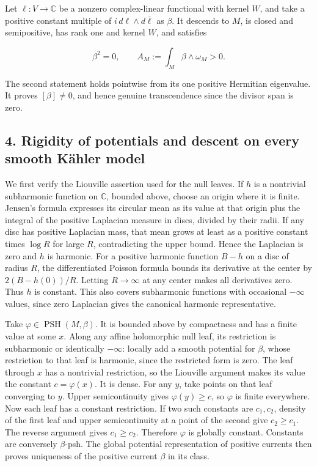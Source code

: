 \documentclass[11pt]{article}
\begin{document}
Let $\ell:V\to\mathbb C$ be a nonzero complex-\allowbreak{}linear functional with kernel $W$, and take a positive constant multiple of $i\,d\ell\wedge d\overline\ell$ as $\beta$. It descends to $M$, is closed and semipositive, has rank one and kernel $W$, and satisfies

\[\beta^2=0,\qquad A_M:=\int_M\beta\wedge\omega_M>0.\]

The second statement holds pointwise from its one positive Hermitian eigenvalue. It proves $[\beta]\ne0$, and hence genuine transcendence since the divisor span is zero.

\subsection{4. Rigidity of potentials and descent on every smooth Kähler model}

We first verify the Liouville assertion used for the null leaves. If $h$ is a nontrivial subharmonic function on $\mathbb C$, bounded above, choose an origin where it is finite. Jensen's formula expresses its circular mean as its value at that origin plus the integral of the positive Laplacian measure in discs, divided by their radii. If any disc has positive Laplacian mass, that mean grows at least as a positive constant times $\log R$ for large $R$, contradicting the upper bound. Hence the Laplacian is zero and $h$ is harmonic. For a positive harmonic function $B-h$ on a disc of radius $R$, the differentiated Poisson formula bounds its derivative at the center by $2(B-h(0))/R$. Letting $R\to\infty$ at any center makes all derivatives zero. Thus $h$ is constant. This also covers subharmonic functions with occasional $-\infty$ values, since zero Laplacian gives the canonical harmonic representative.

Take $\varphi\in\operatorname{PSH}(M,\beta)$. It is bounded above by compactness and has a finite value at some $x$. Along any affine holomorphic null leaf, its restriction is subharmonic or identically $-\infty$: locally add a smooth potential for $\beta$, whose restriction to that leaf is harmonic, since the restricted form is zero. The leaf through $x$ has a nontrivial restriction, so the Liouville argument makes its value the constant $c=\varphi(x)$. It is dense. For any $y$, take points on that leaf converging to $y$. Upper semicontinuity gives $\varphi(y)\geq c$, so $\varphi$ is finite everywhere. Now each leaf has a constant restriction. If two such constants are $c_1,c_2$, density of the first leaf and upper semicontinuity at a point of the second give $c_2\geq c_1$. The reverse argument gives $c_1\geq c_2$. Therefore $\varphi$ is globally constant. Constants are conversely $\beta$-\allowbreak{}psh. The global potential representation of positive currents then proves uniqueness of the positive current $\beta$ in its class.
\end{document}
